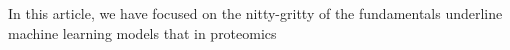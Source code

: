 In this article, we have focused on the nitty-gritty of the fundamentals underline machine learning models that  in proteomics
